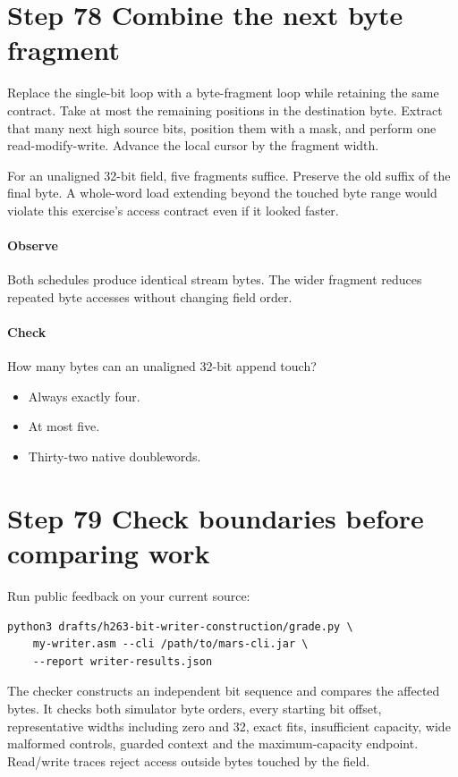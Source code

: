 \section{Step 78 Combine the next byte fragment}\label{h263-writer-s08}
Replace the single-bit loop with a byte-fragment loop while retaining the same
contract. Take at most the remaining positions in the destination byte. Extract
that many next high source bits, position them with a mask, and perform one
read-modify-write. Advance the local cursor by the fragment width.

For an unaligned 32-bit field, five fragments suffice. Preserve the old suffix
of the final byte. A whole-word load extending beyond the touched byte range
would violate this exercise's access contract even if it looked faster.

\paragraph{Observe} Both schedules produce identical stream bytes. The wider
fragment reduces repeated byte accesses without changing field order.
\paragraph{Check} How many bytes can an unaligned 32-bit append touch?
\begin{itemize}
  \item[A.] Always exactly four.
  \item[B.] At most five.
  \item[C.] Thirty-two native doublewords.
\end{itemize}

\section{Step 79 Check boundaries before comparing work}\label{h263-writer-s09}
Run public feedback on your current source:
\begin{verbatim}
python3 drafts/h263-bit-writer-construction/grade.py \
    my-writer.asm --cli /path/to/mars-cli.jar \
    --report writer-results.json
\end{verbatim}
The checker constructs an independent bit sequence and compares the affected
bytes. It checks both simulator byte orders, every starting bit offset, representative
widths including zero and 32, exact fits, insufficient capacity, wide malformed
controls, guarded context and the maximum-capacity endpoint. Read/write traces
reject access outside bytes touched by the field.

